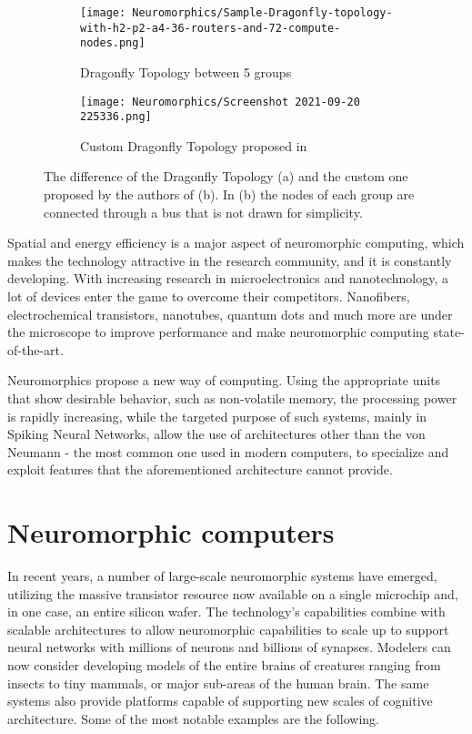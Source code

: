 \documentclass[12pt]{report}
\begin{document}
\begin{figure}
\centering
\begin{subfigure}{.4\textwidth}
  \centering
  \texttt{[image: Neuromorphics/Sample-Dragonfly-topology-with-h2-p2-a4-36-routers-and-72-compute-nodes.png]}
  \caption{Dragonfly Topology between 5 groups}
  \label{fig:sub1}
\end{subfigure}%
\begin{subfigure}{.6\textwidth}
  \centering
  \texttt{[image: Neuromorphics/Screenshot 2021-09-20 225336.png]}
  \caption{Custom Dragonfly Topology proposed in \cite{Akbari2017}}
  \label{fig:sub2}
\end{subfigure}
\caption{\small The difference of the Dragonfly Topology (a) and the custom one proposed by the authors of \cite{Akbari2017} (b). In (b) the nodes of each group are connected through a bus that is not drawn for simplicity.}
\label{fig:test}
\end{figure}

Spatial and energy efficiency is a major aspect of neuromorphic computing, which makes the technology attractive in the research community, and it is constantly developing. With increasing research in microelectronics and nanotechnology, a lot of devices enter the game to overcome their competitors. Nanofibers, electrochemical transistors, nanotubes, quantum dots and much more are under the microscope to improve performance and make neuromorphic computing state-of-the-art.

Neuromorphics propose a new way of computing. Using the appropriate units that show desirable behavior, such as non-volatile memory, the processing power is rapidly increasing, while the targeted purpose of such systems, mainly in Spiking Neural Networks, allow the use of architectures other than the von Neumann - the most common one used in modern computers, to specialize and exploit features that the aforementioned architecture cannot provide.


\section{Neuromorphic computers}

In recent years, a number of large-scale neuromorphic systems have emerged, utilizing the massive transistor resource now available on a single microchip and, in one case, an entire silicon wafer. The technology's capabilities combine with scalable architectures to allow neuromorphic capabilities to scale up to support neural networks with millions of neurons and billions of synapses. Modelers can now consider developing models of the entire brains of creatures ranging from insects to tiny mammals, or major sub-areas of the human brain. The same systems also provide platforms capable of supporting new scales of cognitive architecture. Some of the most notable examples are the following.
\end{document}
